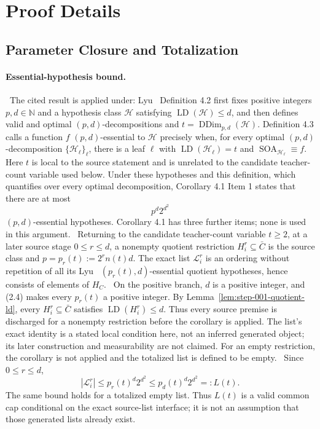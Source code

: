 \appendix

\section{Proof Details}

\subsection{Parameter Closure and Totalization}\label{app:step_001}


\paragraph{Essential-hypothesis bound.}

\noindent \ The cited result is applied under: Lyu~\citep{lyu2025} Definition 4.2 first fixes
  positive integers \(p,d\in\mathbb N\) and a hypothesis class
  \(\mathcal H\) satisfying
  \(\operatorname{LD}(\mathcal H)\le d\), and then defines valid and optimal
  \((p,d)\)-decompositions and
  \(t=\operatorname{DDim}_{p,d}(\mathcal H)\). Definition 4.3 calls a
  function \(f\) \((p,d)\)-essential to \(\mathcal H\) precisely when, for
  every optimal \((p,d)\)-decomposition
  \(\{\mathcal H_\ell\}_{\ell}\), there is a leaf \(\ell\) with
  \(\operatorname{LD}(\mathcal H_\ell)=t\) and
  \(\operatorname{SOA}_{\mathcal H_\ell}\equiv f\). Here \(t\) is local to
  the source statement and is unrelated to the candidate teacher-count
  variable used below. Under these hypotheses and this definition, which
  quantifies over every optimal decomposition, Corollary 4.1 Item 1 states
  that there are at most
  \[
  p^d2^{d^2}
  \]
  \((p,d)\)-essential hypotheses. Corollary 4.1 has three further items;
  none is used in this argument.
\noindent \  Returning to the candidate teacher-count variable
  \(t\ge2\), at a later source stage \(0\le r\le d\), a nonempty quotient
  restriction \(H_i^r\subseteq\bar C\) is the source class and
  \(p=p_r(t):=2^rn(t)d\). The exact list \(\mathcal L_i^r\) is an ordering
  without repetition of all its Lyu~\citep{lyu2025} \((p_r(t),d)\)-essential quotient
  hypotheses, hence consists of elements of \(H_C\).
\noindent \  On the positive branch, \(d\) is a positive integer,
  and (2.4) makes every \(p_r(t)\) a positive integer. By
  Lemma~\ref{lem:step-001-quotient-ld}, every
  \(H_i^r\subseteq\bar C\) satisfies
  \(\operatorname{LD}(H_i^r)\le d\). Thus every source premise is discharged
  for a nonempty restriction before the corollary is applied. The list's
  exact identity is a stated local condition here, not an inferred generated
  object; its later construction and measurability are not claimed. For an
  empty restriction, the corollary is not applied and the totalized list is
  defined to be empty.
\noindent \  Since \(0\le r\le d\),
  \[
  |\mathcal L_i^r|
  \le p_r(t)^d2^{d^2}
  \le p_d(t)^d2^{d^2}=:L(t).
  \]
  The same bound holds for a totalized empty list. Thus \(L(t)\) is a valid
  common cap conditional on the exact source-list interface; it is not an
  assumption that those generated lists already exist.

